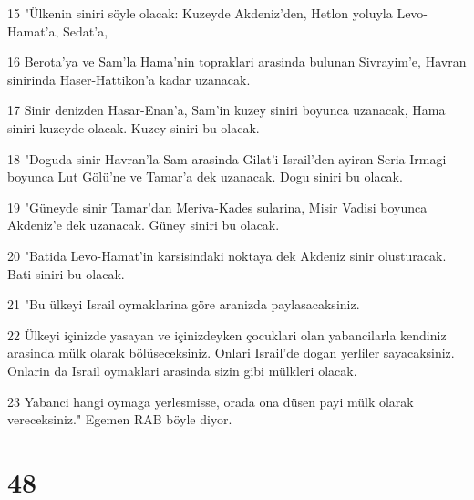 \par 15 "Ülkenin siniri söyle olacak: Kuzeyde Akdeniz'den, Hetlon yoluyla Levo-Hamat'a, Sedat'a,
\par 16 Berota'ya ve Sam'la Hama'nin topraklari arasinda bulunan Sivrayim'e, Havran sinirinda Haser-Hattikon'a kadar uzanacak.
\par 17 Sinir denizden Hasar-Enan'a, Sam'in kuzey siniri boyunca uzanacak, Hama siniri kuzeyde olacak. Kuzey siniri bu olacak.
\par 18 "Doguda sinir Havran'la Sam arasinda Gilat'i Israil'den ayiran Seria Irmagi boyunca Lut Gölü'ne ve Tamar'a dek uzanacak. Dogu siniri bu olacak.
\par 19 "Güneyde sinir Tamar'dan Meriva-Kades sularina, Misir Vadisi boyunca Akdeniz'e dek uzanacak. Güney siniri bu olacak.
\par 20 "Batida Levo-Hamat'in karsisindaki noktaya dek Akdeniz sinir olusturacak. Bati siniri bu olacak.
\par 21 "Bu ülkeyi Israil oymaklarina göre aranizda paylasacaksiniz.
\par 22 Ülkeyi içinizde yasayan ve içinizdeyken çocuklari olan yabancilarla kendiniz arasinda mülk olarak bölüseceksiniz. Onlari Israil'de dogan yerliler sayacaksiniz. Onlarin da Israil oymaklari arasinda sizin gibi mülkleri olacak.
\par 23 Yabanci hangi oymaga yerlesmisse, orada ona düsen payi mülk olarak vereceksiniz." Egemen RAB böyle diyor.

\chapter{48}

